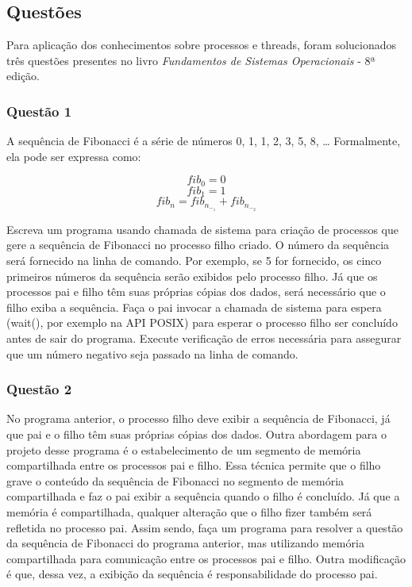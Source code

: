 \documentclass[
	article,			%
	11pt,				%
	oneside,			%
	a4paper,			%
	english,			%
	brazil,				%
	sumario=tradicional
	]{abntex2}
\begin{document}
\subsection*{Questões}

Para aplicação dos conhecimentos sobre processos e threads, foram solucionados três questões presentes no livro \textit{Fundamentos de Sistemas Operacionais} - 8ª edição.

\subsubsection*{Questão 1}

A sequência de Fibonacci é a série de números 0, 1, 1, 2, 3, 5, 8, … Formalmente, ela
pode ser expressa como:

\begin{equation*}
fib_0 = 0
\end{equation*}
\begin{equation*}
fib_1 = 1
\end{equation*}
\begin{equation*}
fib_n = fib_n_-_1 + fib_n_-_2
\end{equation*}

Escreva um programa usando chamada de sistema para criação de processos que gere a
sequência de Fibonacci no processo filho criado. O número da sequência será fornecido
na linha de comando. Por exemplo, se 5 for fornecido, os cinco primeiros números da
sequência serão exibidos pelo processo filho. Já que os processos pai e filho têm suas
próprias cópias dos dados, será necessário que o filho exiba a sequência. Faça o pai
invocar a chamada de sistema para espera (wait(), por exemplo na API POSIX) para
esperar o processo filho ser concluído antes de sair do programa. Execute verificação de
erros necessária para assegurar que um número negativo seja passado na linha de
comando.

\subsubsection*{Questão 2}

No programa anterior, o processo filho deve exibir a sequência de Fibonacci, já que pai e
o filho têm suas próprias cópias dos dados. Outra abordagem para o projeto desse
programa é o estabelecimento de um segmento de memória compartilhada entre os
processos pai e filho. Essa técnica permite que o filho grave o conteúdo da sequência de
Fibonacci no segmento de memória compartilhada e faz o pai exibir a sequência quando o
filho é concluído. Já que a memória é compartilhada, qualquer alteração que o filho fizer
também será refletida no processo pai. Assim sendo, faça um programa para resolver a
questão da sequência de Fibonacci do programa anterior, mas utilizando memória
compartilhada para comunicação entre os processos pai e filho. Outra modificação é que,
dessa vez, a exibição da sequência é responsabilidade do processo pai.
\end{document}
